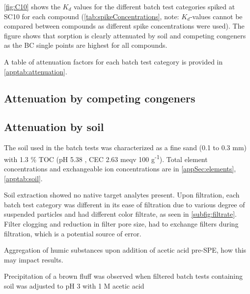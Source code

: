 \cref{fig:C10} shows the $K_d$ values for the different batch test categories spiked at SC10 for each compound (\cref{tab:spikeConcentrations}, note: $K_d$-values cannot be compared between compounds as different spike concentrations were used). The figure shows that sorption is clearly attenuated by soil and competing congeners as the BC single points are highest for all compounds. 

A table of attenuation factors for each batch test category is provided in \cref{apptab:attenuation}.

\subsection{Attenuation by competing congeners}

\subsection{Attenuation by soil}
The soil used in the batch tests was characterized as a fine sand (0.1 to 0.3 mm) with 1.3 \% TOC (pH 5.38 , CEC 2.63  meqv 100 g\textsuperscript{-1}). Total element concentrations and exchangeable ion concentrations are in \cref{appSec:elements}, \cref{apptab:soil}. 

Soil extraction showed no native target analytes present. Upon filtration, each batch test category was different in its ease of filtration due to various degree of suspended particles and had different color filtrate, as seen in \cref{subfig:filtrate}. Filter clogging and reduction in filter pore size, had to exchange filters during filtration, which is a potential source of error. 

Aggregation of humic substances upon addition of acetic acid pre-SPE, how this may impact results. 

Precipitation of a brown fluff was observed when filtered batch tests containing soil was adjusted to pH 3 with 1 M acetic acid

